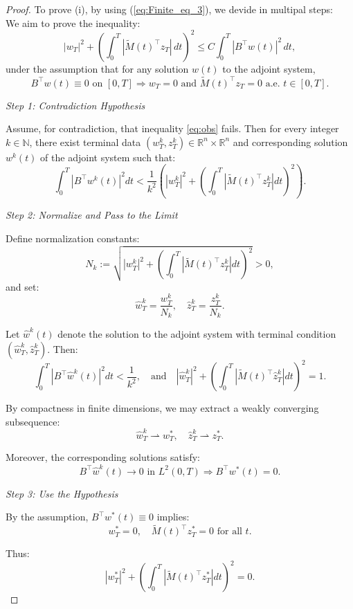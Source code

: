 \documentclass[12pt]{article}
\theoremstyle{plain}
\theoremstyle{definition}
\begin{document}
\begin{proof}
To prove (i), by  using (\ref{eq:Finite_eq_3}), we devide in multipal steps: \\
We aim to prove the inequality:
\begin{equation}\label{eq:obs}
|w_T|^2 + \left( \int_0^T |\widetilde{M}(t)^\top z_T|\, dt \right)^2 \leq C \int_0^T |B^\top w(t)|^2\, dt,
\end{equation}
under the assumption that for any solution $w(t)$ to the adjoint system,
\[
B^\top w(t) \equiv 0 \text{ on } [0, T] \Rightarrow w_T = 0 \text{ and } \widetilde{M}(t)^\top z_T = 0 \text{ a.e. } t \in [0, T].
\]

\textit{Step 1: Contradiction Hypothesis}

Assume, for contradiction, that inequality \eqref{eq:obs} fails. Then for every integer $k \in \mathbb{N}$, there exist terminal data $(w_T^k, z_T^k) \in \mathbb{R}^n \times \mathbb{R}^n$ and corresponding solution $w^k(t)$ of the adjoint system such that:
\[
\int_0^T |B^\top w^k(t)|^2 dt < \frac{1}{k^2} \left( |w_T^k|^2 + \left( \int_0^T |\widetilde{M}(t)^\top z_T^k| dt \right)^2 \right).
\]

\textit{Step 2: Normalize and Pass to the Limit}

Define normalization constants:
\[
N_k := \sqrt{ |w_T^k|^2 + \left( \int_0^T |\widetilde{M}(t)^\top z_T^k| dt \right)^2 } > 0,
\]
and set:
\[
\hat{w}_T^k = \frac{w_T^k}{N_k}, \quad \hat{z}_T^k = \frac{z_T^k}{N_k}.
\]

Let $\hat{w}^k(t)$ denote the solution to the adjoint system with terminal condition $(\hat{w}_T^k, \hat{z}_T^k)$. Then:
\[
\int_0^T |B^\top \hat{w}^k(t)|^2 dt < \frac{1}{k^2}, \quad \text{and} \quad |\hat{w}_T^k|^2 + \left( \int_0^T |\widetilde{M}(t)^\top \hat{z}_T^k| dt \right)^2 = 1.
\]

By compactness in finite dimensions, we may extract a weakly converging subsequence:
\[
\hat{w}_T^k \rightharpoonup w_T^*, \quad \hat{z}_T^k \rightharpoonup z_T^*.
\]

Moreover, the corresponding solutions satisfy:
\[
B^\top \hat{w}^k(t) \to 0 \text{ in } L^2(0,T) \Rightarrow B^\top w^*(t) = 0.
\]

\textit{Step 3: Use the Hypothesis}

By the assumption, $B^\top w^*(t) \equiv 0$ implies:
\[
w_T^* = 0, \quad \widetilde{M}(t)^\top z_T^* = 0 \text{ for all } t.
\]

Thus:
\[
|w_T^*|^2 + \left( \int_0^T |\widetilde{M}(t)^\top z_T^*| dt \right)^2 = 0.
\]


\end{proof}
\end{document}
